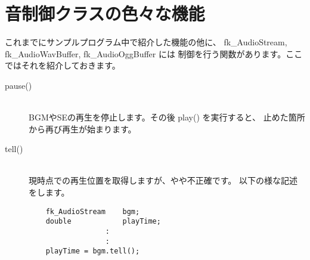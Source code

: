 \section{音制御クラスの色々な機能}
これまでにサンプルプログラム中で紹介した機能の他に、
fk\_AudioStream, fk\_AudioWavBuffer, fk\_AudioOggBuffer には
制御を行う関数があります。ここではそれを紹介しておきます。

\begin{description}
 \item[pause()]~ \\
	BGMやSEの再生を停止します。その後 play() を実行すると、
	止めた箇所から再び再生が始まります。

 \item[tell()]~ \\
	現時点での再生位置を取得しますが、やや不正確です。
	以下の様な記述をします。
	\begin{screen}
	\begin{verbatim}
	fk_AudioStream    bgm;
	double            playTime;
	              :
	              :
	playTime = bgm.tell();
	\end{verbatim}
	\end{screen}
\end{description}
